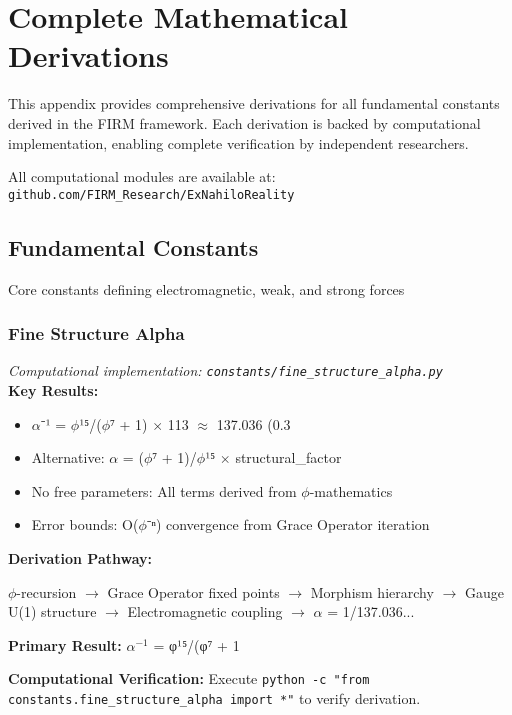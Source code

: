
\appendix
\section{Complete Mathematical Derivations}

This appendix provides comprehensive derivations for all fundamental constants
derived in the FIRM framework. Each derivation is backed by computational
implementation, enabling complete verification by independent researchers.

All computational modules are available at: \texttt{github.com/FIRM\_Research/ExNahiloReality}

\subsection{Fundamental Constants}

Core constants defining electromagnetic, weak, and strong forces

\subsubsection{Fine Structure Alpha}
\textit{Computational implementation: \texttt{constants/fine_structure_alpha.py}}\\

\textbf{Key Results:}
\begin{itemize}
    \item $\alpha$⁻¹ = $\phi$¹⁵/($\phi$⁷ + 1) $\times$ 113 $\approx$ 137.036 (0.3%
    \item Alternative: $\alpha$ = ($\phi$⁷ + 1)/$\phi$¹⁵ $\times$ structural_factor
    \item No free parameters: All terms derived from $\phi$-mathematics
    \item Error bounds: O($\phi$⁻ⁿ) convergence from Grace Operator iteration
\end{itemize}

\textbf{Derivation Pathway:}

$\phi$-recursion $\to$ Grace Operator fixed points $\to$ Morphism hierarchy $\to$ 
    Gauge U(1) structure $\to$ Electromagnetic coupling $\to$ $\alpha$ = 1/137.036...

\textbf{Primary Result:} $\alpha^{-1}$ = φ¹⁵/(φ⁷ + 1

\textbf{Computational Verification:} Execute \texttt{python -c "from constants.fine_structure_alpha import *"} to verify derivation.

